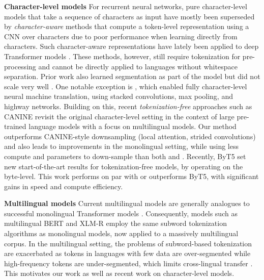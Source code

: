 \documentclass{article} \usepackage{iclr2022_conference,times}
\begin{document}
\noindent \textbf{Character-level models}  For recurrent neural networks, pure character-level models that take a sequence of characters as input \citep{graves2013generating,Zhang2015character,hwang2017character} have mostly been superseded by \emph{character-aware} methods that compute a token-level representation using a CNN over characters \citep{kim2016character,jozefowicz2016exploring,Peters2018elmo} due to poor performance when learning directly from characters. Such character-aware representations have lately been applied to deep Transformer models \citep{el-boukkouri-etal-2020-characterbert,ma-etal-2020-charbert}. These methods, however, still require tokenization for pre-processing and cannot be directly applied to languages without whitespace separation. Prior work also learned segmentation as part of the model but did not scale very well \citep{wang2017sequence,kreutzer2018learning, kawakami-etal-2019-learning}. One notable exception is \citep{lee-etal-2017-fully}, which enabled fully character-level neural machine translation, using stacked convolutions, max pooling, and highway networks. Building on this, recent \emph{tokenization-free} approaches such as CANINE \citep{clark2021canine} 
revisit the original character-level setting in the context of large pre-trained language models with a focus on multilingual models. Our method outperforms CANINE-style downsampling (local attention, strided convolutions) and also leads to improvements in the monolingual setting, while using less compute and parameters to down-sample than both \citet{lee-etal-2017-fully} and \citet{clark2021canine}.  Recently, ByT5 \citep{Xue2021byt5} set new start-of-the-art results for tokenization-free models, by operating on the byte-level. This work performs on par with or outperforms ByT5, with significant gains in speed and compute efficiency. 

\noindent \textbf{Multilingual models}  Current multilingual models are generally analogues to successful monolingual Transformer models \citep{ruder2021xtreme-r}. Consequently, models such as multilingual BERT \citep{Devlin2019bert} and XLM-R \citep{conneau-etal-2020-unsupervised} employ the same subword tokenization algorithms as monolingual models, now applied to a massively multilingual corpus. In the multilingual setting, the problems of subword-based tokenization are exacerbated as tokens in languages with few data are over-segmented while high-frequency tokens are under-segmented, which limits cross-lingual transfer \citep{Wang2021multi-view}. This motivates our work as well as recent work on character-level models.
\end{document}
